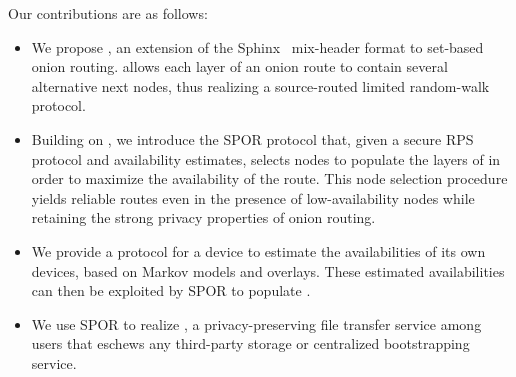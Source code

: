 Our contributions are as follows: 
\begin{itemize}


  \item We propose \Sphinxes, an extension of the
    Sphinx~\cite{Sphinx} mix-header format to set-based onion routing. \Sphinxes allows each layer of an onion route to contain several alternative next nodes, thus realizing a source-routed limited random-walk protocol.

  \item Building on \Sphinxes, we introduce the \ac{SPOR} %
    protocol
    that, given a secure 
    \ac{RPS} protocol and availability estimates, selects nodes to populate the 
    layers of \Sphinxes in order to maximize the availability of the route. This node selection procedure 
    yields reliable routes even in the presence of low-availability nodes while retaining the strong privacy properties of onion routing.

  \item We provide a protocol for a device \squad to estimate the availabilities 
    of its own devices, based on Markov models and \squad overlays.
    These estimated availabilities can then be exploited by \ac{SPOR} to populate \Sphinxes.

  \item We use \ac{SPOR} to realize \name,  a privacy-preserving file transfer service among
  users that eschews any third-party storage or centralized bootstrapping service.

\end{itemize}

